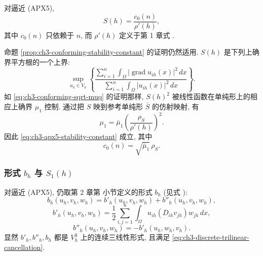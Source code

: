 \begin{Proposition}
\label{prop:ch3-apx5-stability-constant}
对逼近 (APX5),
\begin{equation}
S(h)=\frac{c_0(n)}{\rho'(h)},
\label{eq:ch3-apx5-stability-constant}
\end{equation}
其中 $c_0(n)$ 只依赖于 $n$, 而 $\rho'(h)$ 定义于第 1 章式 .
\end{Proposition}

\hypertarget{chapter-03-page-273}{}
\begin{Proof}
命题 \ref{prop:ch3-conforming-stability-constant} 的证明仍然适用. $S(h)$ 是下列上确界平方根的一个上界:
\begin{equation}
\sup_{u_h\in V_h}
\left\{\frac{\displaystyle\sum_{i=1}^n\int_\Omega|\operatorname{grad}u_{ih}(x)|^2\,dx}
{\displaystyle\sum_{i=1}^n\int_\Omega|u_{ih}(x)|^2\,dx}\right\}.
\label{eq:ch3-apx5-inverse-supremum}
\end{equation}
如 \eqref{eq:ch3-conforming-sqrt-muq} 的证明那样, $S(h)^2$ 被线性函数在单纯形上的相应上确界 $\mu_1$ 控制. 通过把 $S$ 映到参考单纯形 $\bar S$ 的仿射映射, 有
\[
\mu_1=\bar\mu_1\left(\frac{\rho_S}{\rho'(h)}\right)^2.
\]
因此 \eqref{eq:ch3-apx5-stability-constant} 成立, 其中
\begin{equation}
c_0(n)=\sqrt{\bar\mu_1}\,\rho_S.
\label{eq:ch3-apx5-c0}
\end{equation}
\end{Proof}

\subsubsection{形式 $b_h$ 与 $S_1(h)$}
对逼近 (APX5), 仍取第 2 章第  小节定义的形式 $b_h$ (见式 ):
\begin{equation}
b_h(u_h,v_h,w_h)=b'_h(u_h,v_h,w_h)+b''_h(u_h,v_h,w_h),
\label{eq:ch3-apx5-bh-decomposition}
\end{equation}
\begin{equation}
b'_h(u_h,v_h,w_h)=\frac12\sum_{i,j=1}^n\int_\Omega u_{ih}(D_{ih}v_{jh})w_{jh}\,dx,
\label{eq:ch3-apx5-bh-prime}
\end{equation}
\begin{equation}
b''_h(u_h,v_h,w_h)=-b'_h(u_h,w_h,v_h).
\label{eq:ch3-apx5-bh-double-prime}
\end{equation}
显然 $b'_h,b''_h,b_h$ 都是 $V_h^3$ 上的连续三线性形式, 且满足 \eqref{eq:ch3-discrete-trilinear-cancellation}.

